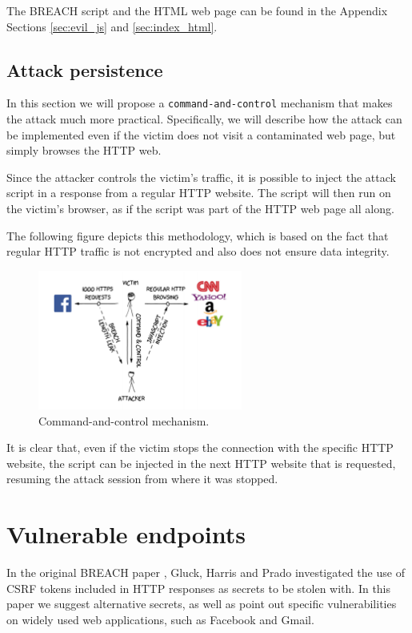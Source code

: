 The BREACH script and the HTML web page can be found in the Appendix Sections
\ref{sec:evil_js} and \ref{sec:index_html}.

\subsection{Attack persistence}\label{sec:persistence}

In this section we will propose a \texttt{command-and-control} mechanism that
makes the attack much more practical. Specifically, we will describe how the
attack can be implemented even if the victim does not visit a contaminated web
page, but simply browses the HTTP web.

Since the attacker controls the victim's traffic, it is possible to inject the
attack script in a response from a regular HTTP website. The script will then
run on the victim's browser, as if the script was part of the HTTP web page all
along.

The following figure depicts this methodology, which is based on the fact that
regular HTTP traffic is not encrypted and also does not ensure data integrity.

\begin{figure}[H] \caption{Command-and-control mechanism.} \centering
\includegraphics[width=0.6\textwidth]{diagrams/breach_mitm.png}\end{figure}

It is clear that, even if the victim stops the connection with the specific HTTP
website, the script can be injected in the next HTTP website that is requested,
resuming the attack session from where it was stopped.

\section{Vulnerable endpoints}\label{sec:vulnerabilities}

In the original BREACH paper \cite{breach}, Gluck, Harris and Prado investigated
the use of CSRF tokens included in HTTP responses as secrets to be stolen with.
In this paper we suggest alternative secrets, as well as point out specific
vulnerabilities on widely used web applications, such as Facebook and Gmail.

